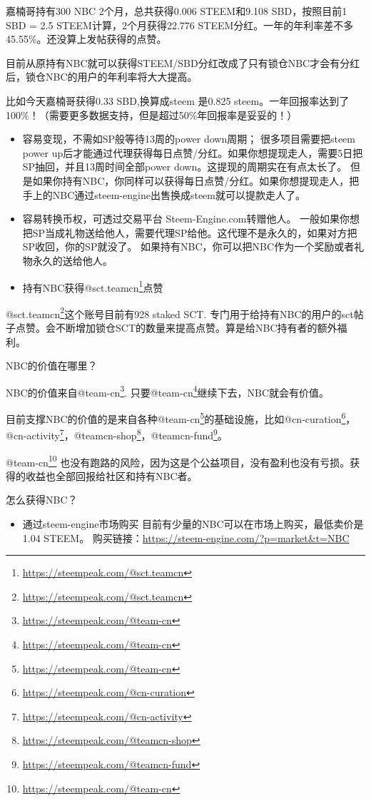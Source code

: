 \documentclass[]{ctexbook}
\providecommand{\tightlist}{%
  \setlength{\itemsep}{0pt}\setlength{\parskip}{0pt}}
\renewcommand{\href}[2]{#2\footnote{\url{#1}}}
\begin{document}
嘉楠哥持有300 NBC 2个月，总共获得0.006 STEEM和9.108 SBD，按照目前1 SBD = 2.5 STEEM计算，2个月获得22.776 STEEM分红。一年的年利率差不多45.55\%。还没算上发帖获得的点赞。

目前从原持有NBC就可以获得STEEM/SBD分红改成了只有锁仓NBC才会有分红后，锁仓NBC的用户的年利率将大大提高。

比如今天嘉楠哥获得0.33 SBD,换算成steem 是0.825 steem。一年回报率达到了100\%！（需要更多数据支持，但是超过50\%年回报率是妥妥的！）

\begin{itemize}
\tightlist
\item
  容易变现，不需如SP般等待13周的power down周期； 很多项目需要把steem power up后才能通过代理获得每日点赞/分红。如果你想提现走人，需要5日把SP抽回，并且13周时间全部power down。这提现的周期实在有点太长了。 但是如果你持有NBC，你同样可以获得每日点赞/分红。如果你想提现走人，把手上的NBC通过steem-engine出售换成steem就可以提款走人了。
\item
  容易转换币权，可透过交易平台 Steem-Engine.com转赠他人。 一般如果你想把SP当成礼物送给他人，需要代理SP给他。这代理不是永久的，如果对方把SP收回，你的SP就没了。 如果持有NBC，你可以把NBC作为一个奖励或者礼物永久的送给他人。
\item
  持有NBC获得\href{https://steempeak.com/@sct.teamcn}{@sct.teamcn}点赞
\end{itemize}

\href{https://steempeak.com/@sct.teamcn}{@sct.teamcn}这个账号目前有928 staked SCT. 专门用于给持有NBC的用户的sct帖子点赞。会不断增加锁仓SCT的数量来提高点赞。算是给NBC持有者的额外福利。

NBC的价值在哪里？

NBC的价值来自\href{https://steempeak.com/@team-cn}{@team-cn}. 只要\href{https://steempeak.com/@team-cn}{@team-cn}继续下去，NBC就会有价值。

目前支撑NBC的价值的是来自各种\href{https://steempeak.com/@team-cn}{@team-cn}的基础设施，比如\href{https://steempeak.com/@cn-curation}{@cn-curation}，\href{https://steempeak.com/@cn-activity}{@cn-activity}，\href{https://steempeak.com/@teamcn-shop}{@teamcn-shop}，\href{https://steempeak.com/@teamcn-fund}{@teamcn-fund}。

\href{https://steempeak.com/@team-cn}{@team-cn} 也没有跑路的风险，因为这是个公益项目，没有盈利也没有亏损。获得的收益也全部回报给社区和持有NBC者。

怎么获得NBC？

\begin{itemize}
\tightlist
\item
  通过steem-engine市场购买 目前有少量的NBC可以在市场上购买，最低卖价是1.04 STEEM。 购买链接：\url{https://steem-engine.com/?p=market\&t=NBC}
\end{itemize}
\end{document}
